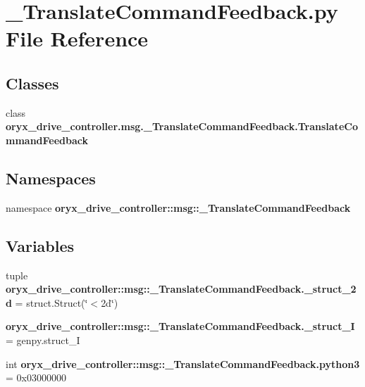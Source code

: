 \section{\-\_\-\-Translate\-Command\-Feedback.\-py \-File \-Reference}
\label{__TranslateCommandFeedback_8py}
\subsection*{\-Classes}
\begin{DoxyCompactItemize}
\item 
class {\bf oryx\-\_\-drive\-\_\-controller.\-msg.\-\_\-\-Translate\-Command\-Feedback.\-Translate\-Command\-Feedback}
\end{DoxyCompactItemize}
\subsection*{\-Namespaces}
\begin{DoxyCompactItemize}
\item 
namespace {\bf oryx\-\_\-drive\-\_\-controller\-::msg\-::\-\_\-\-Translate\-Command\-Feedback}
\end{DoxyCompactItemize}
\subsection*{\-Variables}
\begin{DoxyCompactItemize}
\item 
tuple {\bf oryx\-\_\-drive\-\_\-controller\-::msg\-::\-\_\-\-Translate\-Command\-Feedback.\-\_\-struct\-\_\-2d} = struct.\-Struct(\char`\"{}$<$2d\char`\"{})
\item 
{\bf oryx\-\_\-drive\-\_\-controller\-::msg\-::\-\_\-\-Translate\-Command\-Feedback.\-\_\-struct\-\_\-\-I} = genpy.\-struct\-\_\-\-I
\item 
int {\bf oryx\-\_\-drive\-\_\-controller\-::msg\-::\-\_\-\-Translate\-Command\-Feedback.\-python3} = 0x03000000
\end{DoxyCompactItemize}
